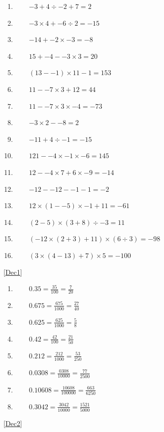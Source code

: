 \documentclass[a4paper,12pt]{article}
\begin{document}
	\begin{multicols}{2}
	\begin{enumerate}[label=\footnotesize \roman*)]
		\item ~~~~$-3+4\div-2+7=2$
		\item ~~~~$-3\times4+-6\div2=-15$
		\item ~~~~$-14+-2\times-3=-8$
		\item ~~~~$15+-4--3\times3=20$
		\item ~~~~$(13--1)\times11-1=153$
		\item ~~~~$11--7\times3+12=44$
		\item ~~~~$11--7\times3\times-4=-73$
		\item ~~~~$-3\times2--8=2$
		\item ~~~~$-11+4\div-1=-15$
		\item ~~~~$121--4\times-1\times-6=145$
		\item ~~~~$12--4\times7+6\times-9=-14$
		\item ~~~~$-12--12--1-1=-2$
		\item ~~~~$12\times(1--5)\times-1+11=-61$
		\item ~~~~$(2-5)\times(3+8)\div-3=11$
		\item ~~~~$(-12\times(2+3)+11)\times(6\div3)=-98$
		\item ~~~~$(3\times(4-13)+7)\times5=-100$
	\end{enumerate}
\end{multicols}
\ref{Dec1}
\begin{multicols}{2}
	\begin{enumerate}
		\item ~~~~$\displaystyle 0.35=\frac{35}{100}=\frac{7}{20}$
		\item ~~~~$\displaystyle 0.675=\frac{675}{1000}=\frac{27}{40}$
		\item ~~~~$\displaystyle 0.625=\frac{625}{1000}=\frac{5}{8}$
		\item ~~~~$\displaystyle 0.42=\frac{42}{100}=\frac{21}{50}$
		\item ~~~~$\displaystyle 0.212=\frac{212}{1000}=\frac{53}{250}$
		\item ~~~~$\displaystyle 0.0308=\frac{0308}{10000}=\frac{77}{2500}$
		\item ~~~~$\displaystyle 0.10608=\frac{10608}{100000}=\frac{663}{6250}$
		\item ~~~~$\displaystyle 0.3042=\frac{3042}{10000}=\frac{1521}{5000}$
	\end{enumerate}
\end{multicols}
\ref{Dec2}
\end{document}
